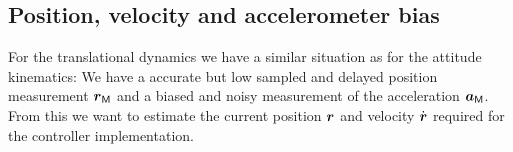 

\subsection{Position, velocity and accelerometer bias}
For the translational dynamics we have a similar situation as for the attitude kinematics:
We have a accurate but low sampled and delayed position measurement $\boldsymbol{r}_{\mathsf{M}}$ and a biased and noisy measurement of the acceleration $\boldsymbol{a}_{\mathsf{M}}$.
From this we want to estimate the current position $\boldsymbol{r}$ and velocity $\dot{\boldsymbol{r}}$ required for the controller implementation.

